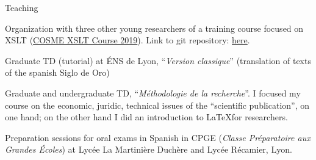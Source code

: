 










\begin{rubric}{Teaching}
                                \entry*[2018-2019]
                                
                            Organization
                with three other young researchers of a training course focused
                on XSLT (\href{https://cosme.hypotheses.org/1117}{COSME
                XSLT Course 2019}). Link to git repository: \href{https://github.com/gabays/Cours\_COSME\_2019}{here}.
                    
                                \entry*
                            Graduate
                TD (tutorial) at ÉNS de Lyon, \enquote{\textit{Version
                classique}} (translation of texts of the spanish
                Siglo de Oro)
                    
                                \entry*
                            Graduate and undergraduate TD,
                \enquote{\textit{Méthodologie de la recherche}}. I focused my
                course on the economic, juridic, technical issues of the
                \enquote{scientific publication}, on one hand; on the other
                hand I did an introduction to \LaTeX for researchers.
                    
                                \entry*[2017-2018]
                                
                            Preparation sessions for oral exams in Spanish in
                        CPGE (\textit{Classe Préparatoire aux Grandes Écoles})
                        at Lycée La Martinière Duchère and Lycée Récamier,
                        Lyon.
                    \end{rubric}


